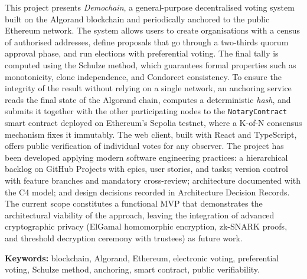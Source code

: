 This project presents \emph{Demochain}, a general-purpose decentralised voting system built on the Algorand blockchain
and periodically anchored to the public Ethereum network.
The system allows users to create organisations with a census of authorised addresses, define proposals that go through
a two-thirds quorum approval phase, and run elections with preferential voting.
The final tally is computed using the Schulze method, which guarantees formal properties such as monotonicity, clone
independence, and Condorcet consistency.
To ensure the integrity of the result without relying on a single network, an anchoring service reads the final state of
the Algorand chain, computes a deterministic \textit{hash}, and submits it together with the other participating nodes
to the \texttt{NotaryContract} smart contract deployed on Ethereum's Sepolia testnet, where a K-of-N consensus mechanism
fixes it immutably.
The web client, built with React and TypeScript, offers public verification of individual votes for any observer.
The project has been developed applying modern software engineering practices: a hierarchical backlog on GitHub Projects
with epics, user stories, and tasks; version control with feature branches and mandatory cross-review; architecture
documented with the C4 model; and design decisions recorded in Architecture Decision Records.
The current scope constitutes a functional \ac{MVP} that demonstrates the architectural viability of the approach,
leaving the integration of advanced cryptographic privacy (ElGamal homomorphic encryption, zk-SNARK proofs, and
threshold decryption ceremony with trustees) as future work.

\textbf{Keywords:} blockchain, Algorand, Ethereum, electronic voting, preferential voting, Schulze method, anchoring,
smart contract, public verifiability.
